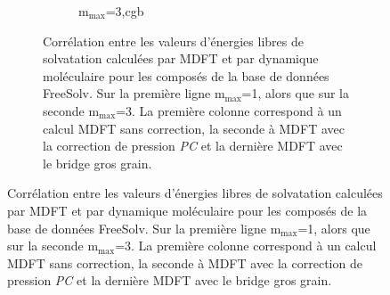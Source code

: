 \begin{figure}
\begin{figure}[H]
\begin{subfigure}[b]{0.30\textwidth}
{          }
       \label{fig:correlation_avec_sans_cgb:mmax3_pc}
    \end{subfigure}
   \begin{subfigure}[b]{0.30\textwidth}
       \centering
       \caption{$\mathrm{m}_\mathrm{max}$=3,cgb}
       \label{fig:correlation_avec_sans_cgb:mmax3_cgb}
    \end{subfigure}
    
    
  \caption[Corrélation entre les valeurs d'énergies libres de solvatation calculées par MDFT et par dynamique moléculaire pour les composés de la base de données FreeSolv.]{Corrélation entre les valeurs d'énergies libres de solvatation calculées par MDFT et par dynamique moléculaire pour les composés de la base de données FreeSolv. Sur la première ligne $\mathrm{m}_\mathrm{max}$=1, alors que sur la seconde $\mathrm{m}_\mathrm{max}$=3. La première colonne correspond à un calcul MDFT sans correction, la seconde à MDFT avec la correction de pression \textit{PC} et la dernière MDFT avec le bridge gros grain. }
  \label{fig:correlation_avec_sans_cgb}
\end{figure}
\end{figure}


